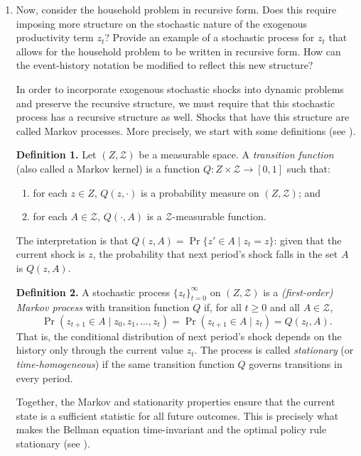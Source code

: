 \documentclass[dvipsnames,11pt]{article}
\begin{document}
\begin{enumerate}
\begin{solution}
                
            \end{solution}

            \item Now, consider the household problem in recursive form. Does this require imposing more structure on the stochastic nature of the exogenous productivity term $z_t$? Provide an example of a stochastic process for $z_t$ that allows for the household problem to be written in recursive form. How can the event-history notation be modified to reflect this new structure?

            \begin{solution}

                 In order to incorporate exogenous stochastic shocks into dynamic problems
  and preserve the recursive structure, we must require that this stochastic
  process has a recursive structure as well. Shocks that have this structure
  are called Markov processes. More precisely, we start with some definitions (see \cite{stokey1989recursive}).

  \textbf{Definition 1.} Let $(Z, \mathcal{Z})$ be a measurable space. A
  \emph{transition function} (also called a Markov kernel) is a function $Q : Z \times \mathcal{Z} \to [0,1]$
  such that:
  \begin{enumerate}
      \item for each $z \in Z$, $Q(z, \cdot)$ is a probability measure on
      $(Z, \mathcal{Z})$; and
      \item for each $A \in \mathcal{Z}$, $Q(\cdot, A)$ is a
      $\mathcal{Z}$-measurable function.
  \end{enumerate}
  The interpretation is that $Q(z,A) = \Pr\{z' \in A \mid z_t = z\}$: given
  that the current shock is $z$, the probability that next period's shock falls
  in the set $A$ is $Q(z,A)$.

  \textbf{Definition 2.} A stochastic process $\{z_t\}_{t=0}^{\infty}$ on
  $(Z,\mathcal{Z})$ is a \emph{(first-order) Markov process} with transition
  function $Q$ if, for all $t \geq 0$ and all $A \in \mathcal{Z}$,
  \[
      \Pr(z_{t+1} \in A \mid z_0, z_1, \ldots, z_t)
      = \Pr(z_{t+1} \in A \mid z_t)
      = Q(z_t, A).
  \]
  That is, the conditional distribution of next period's shock depends on
  the history only through the current value $z_t$. The process is called
  \emph{stationary} (or \emph{time-homogeneous}) if the same transition
  function $Q$ governs transitions in every period.

  Together, the Markov and stationarity properties ensure that the current
  state is a sufficient statistic for all future outcomes. This is precisely
  what makes the Bellman equation time-invariant and the optimal policy rule
  stationary (see \cite{stokey1989recursive}).


\end{solution}
\end{enumerate}
\end{document}
